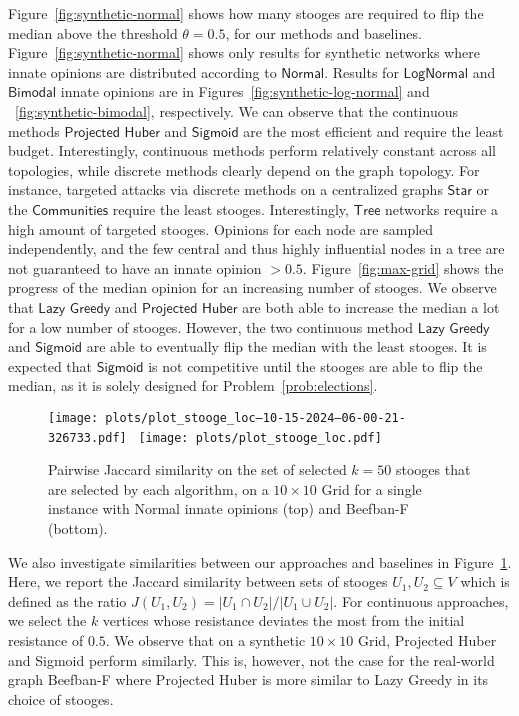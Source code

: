 Figure~\ref{fig:synthetic-normal} 
shows how many
stooges are required to flip the median
above the threshold $\theta=0.5$,
for our methods and baselines.
Figure~\ref{fig:synthetic-normal} shows only
results for synthetic networks where innate
opinions are distributed according to
$\textsf{Normal}$. Results for
$\textsf{LogNormal}$ and $\textsf{Bimodal}$
innate opinions are in
Figures~\ref{fig:synthetic-log-normal}
and ~\ref{fig:synthetic-bimodal}, respectively.
We can observe that the continuous methods
$\textsf{Projected Huber}$ and $\textsf{Sigmoid}$
are the most efficient and require the
least budget.
Interestingly, continuous
methods perform relatively constant across
all topologies, while discrete methods
clearly depend on the graph topology.
For instance, targeted attacks via
discrete methods on a centralized graphs
$\mathsf{Star}$ or the $\mathsf{Communities}$
require the least stooges.
Interestingly, $\textsf{Tree}$ networks
require a high amount of targeted
stooges. Opinions for each
node are sampled independently, and
the few central and thus highly
influential nodes in a tree are not
guaranteed to have an innate
opinion $> 0.5$.
Figure~\ref{fig:max-grid}
shows the progress of the median
opinion for an increasing number
of stooges. We observe that
$\textsf{Lazy Greedy}$ and
$\textsf{Projected Huber}$
are both able to increase
the median a lot for a low
number of stooges. However,
the two continuous method
$\textsf{Lazy Greedy}$
and $\textsf{Sigmoid}$
are able to eventually flip the median
with the least stooges.
It is expected that
$\textsf{Sigmoid}$ is not competitive
until the stooges are able to flip
the median, as it is solely designed
for Problem~\ref{prob:elections}.

\begin{figure}
    \centering
    \texttt{[image: plots/plot\_stooge\_loc--10-15-2024--06-00-21-326733.pdf]}~
    \texttt{[image: plots/plot\_stooge\_loc.pdf]}
    \figsp
    \caption{Pairwise Jaccard similarity on the set of
    selected $k=50$ stooges that are selected by each algorithm, on
    a $10 \times 10$ \textsf{Grid} for a single
    instance with \textsf{Normal} innate opinions (top)
    and \textsf{Beefban-F} (bottom).}
    \label{fig:jaccard}
\end{figure}

We also investigate
similarities between our
approaches and baselines in
Figure~\ref{fig:jaccard}.
Here, we report the
Jaccard similarity between
sets of stooges
$U_1, U_2 \subseteq V$ which
is defined as the ratio
$J(U_1, U_2) = |U_1 \cap U_2| / |U_1 \cup U_2|$.
For continuous approaches,
we select the $k$ vertices
whose resistance deviates
the most from the initial
resistance of $0.5$.
We observe that on a synthetic
$10\times 10$ \textsf{Grid}, \textsf{Projected Huber}
and \textsf{Sigmoid} perform
similarly. This is, however,
not the case for the real-world
graph \textsf{Beefban-F} where
\textsf{Projected Huber}
is more similar to \textsf{Lazy Greedy}
in its choice of stooges.



